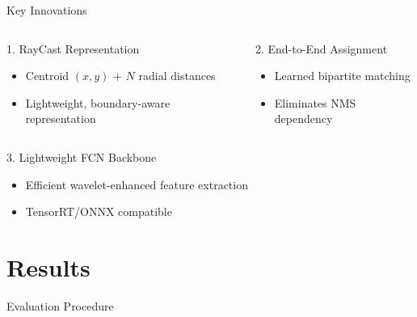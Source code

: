 \documentclass[aspectratio=169, 10pt]{beamer}
\begin{document}
\begin{frame}{Key Innovations}
  \begin{columns}
    \begin{block}{1. RayCast Representation}
      \begin{itemize}
        \item Centroid $(x, y)$ + $N$ radial distances
        \item Lightweight, boundary-aware representation
      \end{itemize}
    \end{block}

    \begin{block}{2. End-to-End Assignment}
      \begin{itemize}
        \item Learned bipartite matching
        \item Eliminates NMS dependency
      \end{itemize}
    \end{block}
  \end{columns}

  \vspace{1em}
  \begin{block}{3. Lightweight FCN Backbone}
    \begin{itemize}
      \item Efficient wavelet-enhanced feature extraction
      \item TensorRT/ONNX compatible
    \end{itemize}
  \end{block}
\end{frame}



\section{Results}

\begin{frame}{Evaluation Procedure}
  \begin{center}
    \resizebox{0.9\textwidth}{!}{}
  \end{center}
\end{frame}
\end{document}
